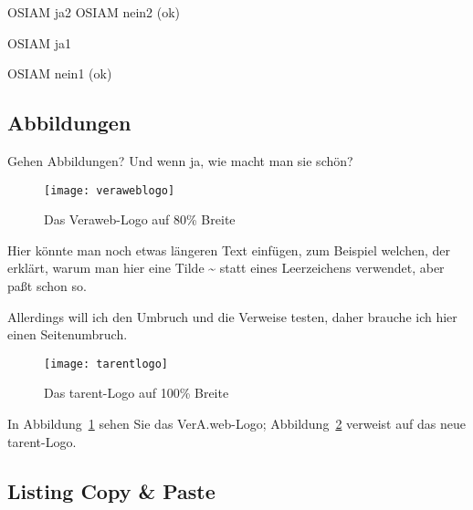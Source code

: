 \documentclass{tarentanleitung}
\begin{document}
\ifosiam
 OSIAM ja2
\else
 OSIAM nein2 (ok)
\fi

\ifosiam
 OSIAM ja1
\fi

\ifosiam\else
 OSIAM nein1 (ok)
\fi

\subsection{Abbildungen}

Gehen Abbildungen? Und wenn ja, wie macht man sie schön?

\begin{figure}[h!]
 \centering\texttt{[image: veraweblogo]}
 \caption{Das Veraweb-Logo auf 80\% Breite}
 \label{fig:logovw}
\end{figure}

Hier könnte man noch etwas längeren Text einfügen, zum Beispiel
welchen, der erklärt, warum man hier eine Tilde \~{} statt eines
Leerzeichens verwendet, aber paßt schon so.

\newpage

Allerdings will ich den Umbruch und die Verweise testen, daher
brauche ich hier einen Seitenumbruch.

\begin{figure}[h!]
 \centering\texttt{[image: tarentlogo]}
 \caption{Das tarent-Logo auf 100\% Breite}
 \label{fig:logotarent}
\end{figure}

In Abbildung~\ref{fig:logovw} sehen Sie das VerA.web-Logo;
Abbildung~\ref{fig:logotarent} verweist auf das neue tarent-Logo.

\subsection{Listing Copy \& Paste}
\end{document}
